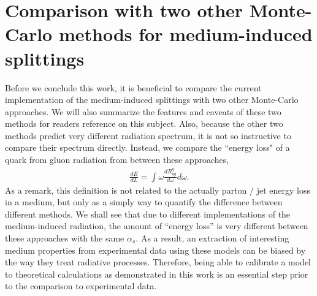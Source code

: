\documentclass[aps, prc, reprint, amsmath, groupedaddress, nofootinbib]{revtex4-1}
\begin{document}
\section{Comparison with two other Monte-Carlo methods for medium-induced splittings}\label{section:compare}
Before we conclude this work, it is beneficial to compare the current implementation of the medium-induced splittings with two other Monte-Carlo approaches.
We will also summarize the features and caveats of these two methods for readers reference on this subject. 
Also, because the other two methods predict very different radiation spectrum, it is not so instructive to compare their spectrum directly.
Instead, we compare the ``energy loss" of a quark from gluon radiation from between these approaches,
\begin{eqnarray}
\frac{dE}{dL} = \int \omega \frac{dR^q_{qg}}{d\omega} d\omega.
\label{eq:eloss}
\end{eqnarray}
As a remark, this definition is not related to the actually parton / jet energy loss in a medium, but only as a simply way to quantify the difference between different methods.
We shall see that due to different implementations of the medium-induced radiation, the amount of ``energy loss'' is very different between these approaches with the same $\alpha_s$.
As a result, an extraction of interesting medium properties from experimental data using these models can be biased by the way they treat radiative processes.
Therefore, being able to calibrate a model to theoretical calculations as demonstrated in this work is an essential step prior to the comparison to experimental data.
\end{document}
